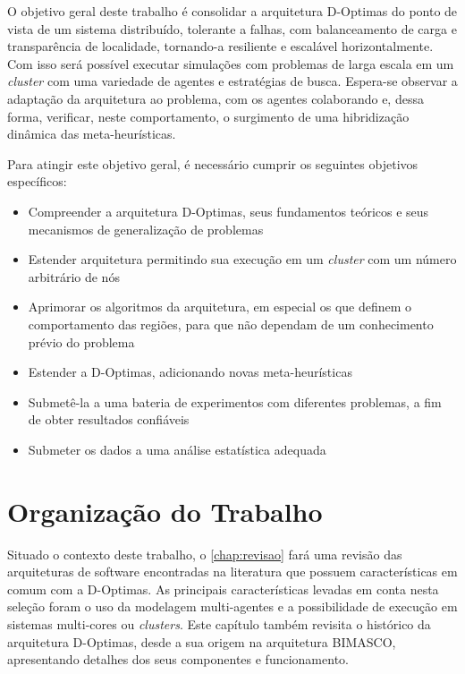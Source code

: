 O objetivo geral deste trabalho é consolidar a arquitetura D-Optimas do ponto de vista de um sistema distribuído, tolerante a falhas, com balanceamento de carga e transparência de localidade, tornando-a resiliente e escalável horizontalmente. Com isso será possível executar simulações com problemas de larga escala em um \textit{cluster} com uma variedade de agentes e estratégias de busca. Espera-se observar a adaptação da arquitetura ao problema, com os agentes colaborando e, dessa forma, verificar, neste comportamento,  o surgimento de uma hibridização dinâmica das meta-heurísticas.

Para atingir este objetivo geral, é necessário cumprir os seguintes objetivos específicos: 

\begin{itemize}
    \item Compreender a arquitetura D-Optimas, seus fundamentos teóricos e seus mecanismos de generalização de problemas
    \item Estender arquitetura permitindo sua execução em um \textit{cluster} com um número arbitrário de nós
    \item Aprimorar os algoritmos da arquitetura, em especial os que definem o comportamento das regiões, para que não dependam de um conhecimento prévio do problema 
    \item Estender a D-Optimas, adicionando novas meta-heurísticas
    \item Submetê-la a uma bateria de experimentos com diferentes problemas, a fim de obter resultados confiáveis
    \item Submeter os dados a uma análise estatística adequada 
\end{itemize}

\section{Organização do Trabalho}

Situado o contexto deste trabalho, o \autoref{chap:revisao} fará uma revisão das arquiteturas de software encontradas na literatura que possuem características em comum com a D-Optimas. As principais características levadas em conta nesta seleção foram o uso da modelagem multi-agentes e a possibilidade de execução em sistemas multi-cores ou \textit{clusters}. Este capítulo também revisita o histórico da arquitetura D-Optimas, desde a sua origem na arquitetura BIMASCO, apresentando detalhes dos seus componentes e funcionamento. 

